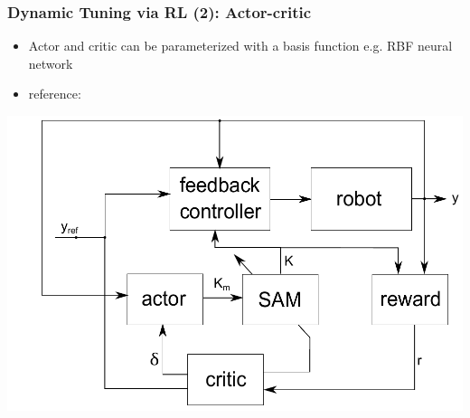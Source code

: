 \documentclass{beamer}
\begin{document}
			
			\begin{frame}\frametitle{Dynamic Tuning via RL (2): Actor-critic}
				\vspace{3mm}
				\fontsize{8}{4}\selectfont 
				\begin{itemize}
					\item Actor and critic can be parameterized with a basis function e.g. RBF neural network
					\item reference: \citet{Sedighizadeh2008}
				\end{itemize}
				\begin{center}
					\includegraphics[width=0.70\linewidth]{images/actorcritic_dynamictuning}
				\end{center}
			\end{frame}			
			
\end{document}
